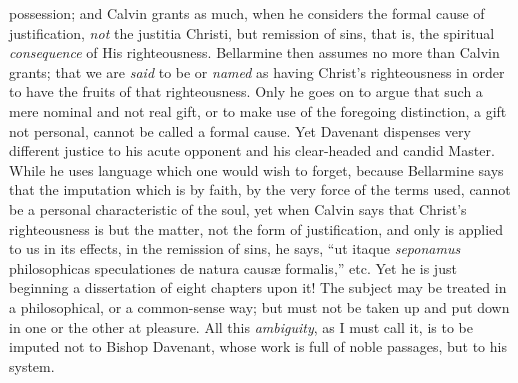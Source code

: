 possession; and Calvin grants as much, when he considers the formal
cause of justification, \emph{not} the justitia Christi, but remission
of sins, that is, the spiritual \emph{consequence} of His
righteousness. Bellarmine then assumes no more than Calvin
grants; that we are \emph{said} to be or \emph{named} as having
Christ's righteousness in order to have the fruits of that
righteousness. Only he goes on to argue that such a mere nominal and
not real gift, or to make use of the foregoing distinction, a gift not
personal, cannot be called a formal cause. Yet Davenant dispenses very
different justice to his acute opponent and his clear-headed and
candid Master. While he uses language which one would wish to forget,
because Bellarmine says that the imputation which is by faith, by the
very force of the terms used, cannot be a personal characteristic of
the soul, yet when Calvin says that Christ's righteousness is but the
matter, not the form of justification, and only is applied to us in
its effects, in the remission of sins, he says, ``ut itaque \emph{seponamus}
philosophicas speculationes de natura causæ formalis,'' etc. Yet
he is just beginning a dissertation of eight chapters upon it! The
subject may be treated in a philosophical, or a common-sense way; but
must not be taken up and put down in one or the other at pleasure. All
this \emph{ambiguity}, as I must call it, is to be imputed not to
Bishop Davenant, whose work is full of noble passages, but to his
system.

